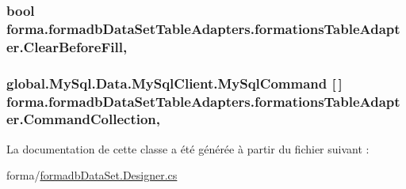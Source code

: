 \subsubsection[{\texorpdfstring{Clear\+Before\+Fill}{ClearBeforeFill}}]{\setlength{\rightskip}{0pt plus 5cm}bool forma.\+formadb\+Data\+Set\+Table\+Adapters.\+formations\+Table\+Adapter.\+Clear\+Before\+Fill\hspace{0.3cm}{\ttfamily [get]}, {\ttfamily [set]}}\hypertarget{classforma_1_1formadb_data_set_table_adapters_1_1formations_table_adapter_ab4ac941b514cb06bdcd3277e51d5c916}{}\label{classforma_1_1formadb_data_set_table_adapters_1_1formations_table_adapter_ab4ac941b514cb06bdcd3277e51d5c916}
\subsubsection[{\texorpdfstring{Command\+Collection}{CommandCollection}}]{\setlength{\rightskip}{0pt plus 5cm}global.\+My\+Sql.\+Data.\+My\+Sql\+Client.\+My\+Sql\+Command \mbox{[}$\,$\mbox{]} forma.\+formadb\+Data\+Set\+Table\+Adapters.\+formations\+Table\+Adapter.\+Command\+Collection\hspace{0.3cm}{\ttfamily [get]}, {\ttfamily [protected]}}\hypertarget{classforma_1_1formadb_data_set_table_adapters_1_1formations_table_adapter_aa2d09cc6d602087b44e1bbbfff042865}{}\label{classforma_1_1formadb_data_set_table_adapters_1_1formations_table_adapter_aa2d09cc6d602087b44e1bbbfff042865}


La documentation de cette classe a été générée à partir du fichier suivant \+:\begin{DoxyCompactItemize}
\item 
forma/\hyperlink{formadb_data_set_8_designer_8cs}{formadb\+Data\+Set.\+Designer.\+cs}\end{DoxyCompactItemize}
